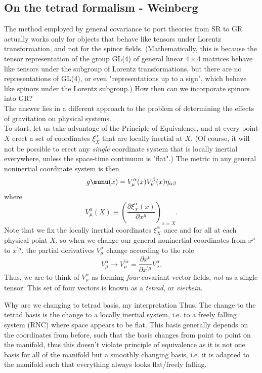\subsection{On the tetrad formalism - Weinberg}
The method employed by general covariance to port theories from SR to GR actually works only for objects that behave like tensors under Lorentz transformation, and not for the spinor fields. (Mathematically, this is because the tensor representation of the group GL(4) of general linear $4\times4$ matrices behave like tensors under the subgroup of Lorentz transformations, but there are no representations of GL(4), or even "representations up to a sign", which behave like spinors under the Lorentz subgroup.) How then can we incorporate spinors into GR?\\
The answer lies in a different approach to the problem of determining the effects of gravitation on physical systems.\\
To start, let us take advantage of the Principle of Equivalence, and at every point $X$ erect a set of coordinates $\xi^\alpha_X$ that are locally inertial at $X$. (Of course, it will not be possible to erect any \emph{single} coordinate system that is locally inertial everywhere, unless the space-time continuum is "flat".) The metric in any general noninertial coordinate system is then
\begin{equation}
g\munu (x)  = V^\alpha_\mu(x) V^\beta_\nu(x) \eta_{\alpha \beta}
\end{equation}
where 
\begin{equation}
	V^\alpha_\mu(X) \equiv \left(\frac{ \partial \xi^\alpha_X(x)}{\partial x^\mu}\right)_{x=X}.
\end{equation}
Note that we fix the locally inertial coordinates $\xi^\alpha_X$ once and for all at each physical point $X$, so when we change our general noninertial coordinates from $x^\mu$ to $x^{\prime \mu}$, the partial derivatives $V^\alpha_\mu$ change according to the role
\begin{equation}
	V^\alpha_\mu \rightarrow V^{\prime \alpha}_\mu = \frac{\partial x^\nu}{\partial x^{\prime \mu}} V^\alpha_\nu.
\end{equation}
Thus, we are to think of $V^\alpha_\mu$ as forming \emph{four} covariant vector fields, \emph{not} as a single tensor: This set of four vectors is known as a \emph{tetrad}, or \emph{vierbein}.
\begin{mybox}{Why are we changing to tetrad basis, my interpretation}
	Thus, The change to the tetrad basis is the change to a locally inertial system, i.e. to a freely falling system (RNC) where space appears to be flat. This basis generally depends on the coordinates from before, such that the basis changes from point to point on the manifold, thus this doesn't violate principle of equivalence as it is not one basis for all of the manifold but a smoothly changing basis, i.e. it is adapted to the manifold such that everything always looks flat/freely falling.
\end{mybox}
